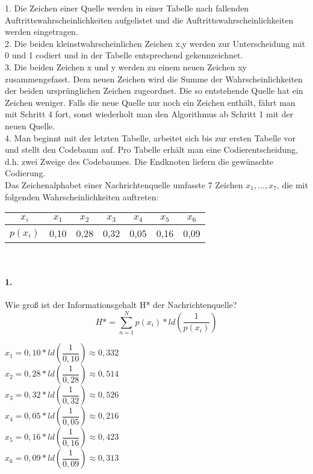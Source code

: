 \documentclass[paper=a4, fontsize=11pt]{scrartcl}
\numberwithin{equation}{section}
\numberwithin{figure}{section}
\numberwithin{table}{section}
\begin{document}
1. Die Zeichen einer Quelle werden in einer Tabelle nach fallenden Auftrittswahrscheinlichkeiten aufgelistet und die Auftrittswahrscheinlichkeiten werden eingetragen. \\
2. Die beiden kleinstwahrscheinlichen Zeichen x,y werden zur Unterscheidung mit 0 und 1 codiert und in der Tabelle entsprechend gekennzeichnet. \\
3. Die beiden Zeichen x und y werden zu einem neuen Zeichen xy zusammengefasst. Dem neuen Zeichen wird die Summe der Wahrscheinlichkeiten der beiden ursprünglichen Zeichen zugeordnet. Die so entstehende Quelle hat ein Zeichen weniger. Falls die neue Quelle nur noch ein Zeichen enthält, fährt man mit Schritt 4 fort, sonst wiederholt man den Algorithmus ab Schritt 1 mit der neuen Quelle. \\
4. Man beginnt mit der letzten Tabelle, arbeitet sich bis zur ersten Tabelle vor und stellt den Codebaum auf. Pro Tabelle erhält man eine Codierentscheidung, d.h. zwei Zweige des Codebaumes. Die Endknoten liefern die gewünschte Codierung. \\

Das Zeichenalphabet einer Nachrichtenquelle umfasste 7 Zeichen $x_{1}, ..., x_{7}$, die mit folgenden Wahrscheinlichkeiten auftreten: 

\begin{center}
\begin{tabular}{|c||c|c|c|c|c|c|}
\hline
$x_{i}$ & $x_{1}$ & $x_{2}$ & $x_{3}$ & $x_{4}$ & $x_{5}$ & $x_{6}$\\
\hline
$p(x_{i})$ & 0,10 & 0,28 & 0,32 & 0,05 & 0,16 & 0,09 \\
\hline
\end{tabular}
\end{center}
\\

\paragraph{1.}
Wie groß ist der Informationsgehalt H* der Nachrichtenquelle? \\

$$H* = \sum^{N}_{n=1} p(x_{i})*ld( \dfrac{1}{p(x_{i})})$$

$x_{1} = 0,10 * ld(\dfrac{1}{0,10})\approx 0,332$ \\
$x_{2} = 0,28 * ld(\dfrac{1}{0,28})\approx 0,514$ \\
$x_{3} = 0,32 * ld(\dfrac{1}{0,32})\approx 0,526$ \\
$x_{4} = 0,05 * ld(\dfrac{1}{0,05})\approx 0,216$ \\
$x_{5} = 0,16 * ld(\dfrac{1}{0,16})\approx 0,423$ \\
$x_{6} = 0,09 * ld(\dfrac{1}{0,09})\approx 0,313$ \\
\end{document}
